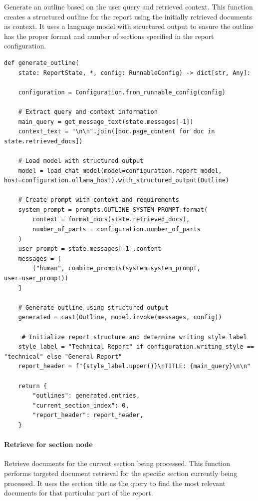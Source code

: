 \documentclass[11pt,a4paper]{report}
\begin{document}
Generate an outline based on the user query and retrieved context. This function creates a structured outline for the report using the initially retrieved documents as context. It uses a language model with structured output to ensure the outline has the proper format and number of sections specified in the report configuration.

\begin{lstlisting}[caption={Initial retrieval node}]
def generate_outline(
    state: ReportState, *, config: RunnableConfig) -> dict[str, Any]:

    configuration = Configuration.from_runnable_config(config)
    
    # Extract query and context information
    main_query = get_message_text(state.messages[-1])
    context_text = "\n\n".join([doc.page_content for doc in state.retrieved_docs])
    
    # Load model with structured output
    model = load_chat_model(model=configuration.report_model, host=configuration.ollama_host).with_structured_output(Outline)
    
    # Create prompt with context and requirements
    system_prompt = prompts.OUTLINE_SYSTEM_PROMPT.format(
        context = format_docs(state.retrieved_docs),
        number_of_parts = configuration.number_of_parts
    )
    user_prompt = state.messages[-1].content
    messages = [
        ("human", combine_prompts(system=system_prompt, user=user_prompt))
    ]

    # Generate outline using structured output
    generated = cast(Outline, model.invoke(messages, config))

     # Initialize report structure and determine writing style label
    style_label = "Technical Report" if configuration.writing_style == "technical" else "General Report"
    report_header = f"{style_label.upper()}\nTITLE: {main_query}\n\n"
    
    return {
        "outlines": generated.entries,
        "current_section_index": 0,
        "report_header": report_header,
    }    
\end{lstlisting}

\paragraph{Retrieve for section node}

    Retrieve documents for the current section being processed. This function performs targeted document retrieval for the specific section currently being processed. It uses the section title as the query to find the most relevant documents for that particular part of the report.
\end{document}
